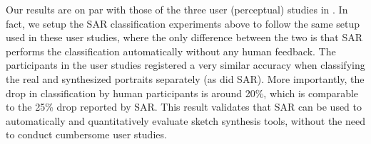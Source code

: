 Our results are on par with those of the three user (perceptual) studies in . In fact, we setup the SAR classification experiments above to follow the same setup used in these user studies, where the only difference between the two is that SAR performs the classification automatically without any human feedback. The participants in the user studies registered a very similar accuracy when classifying the real and synthesized portraits separately (as did SAR). More importantly, the drop in classification by human participants is around 20\%, which is comparable to the 25\% drop reported by SAR. This result validates that SAR can be used to automatically and quantitatively evaluate sketch synthesis tools, without the need to conduct cumbersome user studies.





